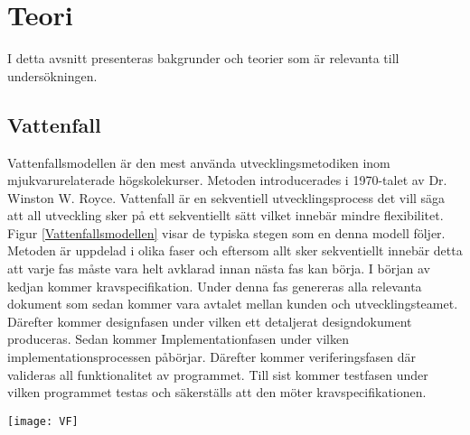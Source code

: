 \section{Teori} \label{sec:Lieth_Wahid-theory}
I detta avsnitt presenteras bakgrunder och teorier som är relevanta till undersökningen. 
\subsection{Vattenfall}
Vattenfallsmodellen är den mest använda utvecklingsmetodiken inom mjukvarurelaterade högskolekurser. Metoden introducerades i 1970-talet  \cite{WaterfalM} av Dr. Winston W. Royce\cite{managing}. Vattenfall är en sekventiell utvecklingsprocess det vill säga att all utveckling sker på ett sekventiellt sätt vilket innebär mindre flexibilitet. Figur \ref{Vattenfallsmodellen} visar de typiska 
stegen som en denna modell följer. Metoden är uppdelad i olika faser och eftersom allt sker sekventiellt innebär detta att varje fas måste vara helt avklarad innan nästa fas kan börja.  I början av kedjan kommer kravspecifikation. Under denna fas genereras alla relevanta dokument som sedan kommer vara avtalet mellan kunden och utvecklingsteamet. \cite{GameDesign} Därefter kommer designfasen under vilken ett detaljerat designdokument produceras. Sedan kommer Implementationfasen under vilken implementationsprocessen  påbörjar. Därefter kommer veriferingsfasen där valideras all funktionalitet  av programmet. Till sist kommer testfasen under vilken programmet testas och säkerställs  att den möter kravspecifikationen.
\begin{figure*}[h]
	\centering
	\texttt{[image: VF]}
	\caption{Vattenfallsmodellen\cite{theWaterFall}}
	\label{Vattenfallsmodellen}
\end{figure*}
